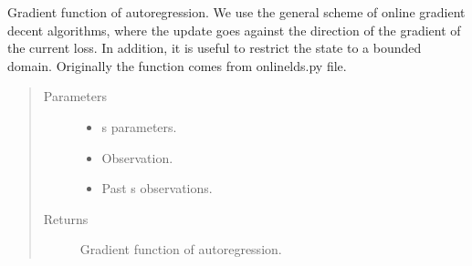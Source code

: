 \documentclass[letterpaper,10pt,english]{sphinxmanual}
\begin{document}
\begin{fulllineitems}
\label{\detokenize{LDS:LDS.OnlineLDS_library.gradient_ar}}
\sphinxAtStartPar
Gradient function of auto\sphinxhyphen{}regression.
We use the general scheme of on\sphinxhyphen{}line gradient decent algorithms,
where the update goes against the direction of the gradient of the current loss.
In addition, it is useful to restrict the state to a bounded domain.
Originally the function comes from onlinelds.py file.
\begin{quote}\begin{description}
\item[{Parameters}] \leavevmode\begin{itemize}
\item {} 
\sphinxAtStartPar
{} \textendash{} s parameters.

\item {} 
\sphinxAtStartPar
{}\sphinxstyleliteralstrong{\sphinxupquote{{[}}}\sphinxstyleliteralstrong{\sphinxupquote{{]}}} \textendash{} Observation.

\item {} 
\sphinxAtStartPar
{}\sphinxstyleliteralstrong{\sphinxupquote{{[}}}\sphinxstyleliteralstrong{\sphinxupquote{{]}}} \textendash{} Past s observations.

\end{itemize}

\item[{Returns}] \leavevmode
\sphinxAtStartPar
Gradient function of auto\sphinxhyphen{}regression.

\end{description}\end{quote}

\end{fulllineitems}

\end{document}

